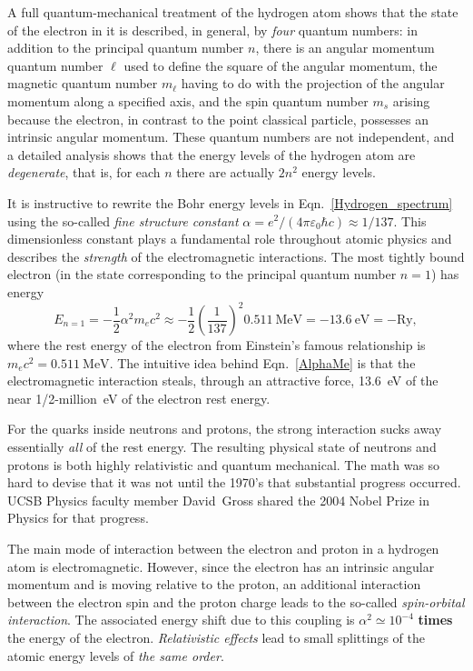 \documentclass[12pt]{article}
\begin{document}
A full quantum-mechanical treatment of the hydrogen atom shows that the state of the electron in it is described, in general, by \textit{four} quantum numbers: in addition to the principal quantum number $n$, there is an angular momentum quantum number $\ell$ used to define the square of the angular momentum, the magnetic quantum number $m_{\ell}$ having to do with the projection of the angular momentum along a specified axis, and the spin quantum number $m_s$ arising because the electron, in contrast to the point classical particle, possesses an intrinsic angular momentum. These quantum numbers are not independent, and a detailed analysis shows that the energy levels of the hydrogen atom are \textit{degenerate}, that is, for each $n$ there are actually $2n^2$ energy levels. 

It is instructive to rewrite the Bohr energy levels in Eqn.~\ref{Hydrogen_spectrum} using the so-called \textit{fine structure constant} $\alpha = e^2/(4\pi \varepsilon_0 \hbar c) \approx 1/137$. This dimensionless constant plays a fundamental role throughout atomic physics and describes the \textit{strength} of the electromagnetic interactions. The most tightly bound electron (in the state corresponding to the principal quantum number $n = 1$) has energy
\begin{equation}
    E_{n=1} = -\frac{1}{2}\alpha^2 m_e c^2 \approx -\frac{1}{2} \left(\frac{1}{137}\right)^2 0.511~\text{MeV} = -13.6~\text{eV} = -\text{Ry},
    \label{AlphaMe}
\end{equation}
where the rest energy of the electron from Einstein’s famous relationship is $m_e c^2 = 0.511~\text{MeV}$.  The intuitive idea behind Eqn.~\ref{AlphaMe} is that the electromagnetic interaction steals, through an attractive force,  13.6~eV of the near 1/2-million~eV of the electron rest energy.

For the quarks inside neutrons and protons, the strong interaction sucks away essentially \emph{all} of the rest energy.  The resulting physical state of neutrons and protons is both highly relativistic and quantum mechanical.  The math was so hard to devise that it was not until the 1970's that substantial progress occurred.  UCSB Physics faculty member David~Gross shared the 2004 Nobel Prize in Physics for that progress.

The main mode of interaction between the electron and proton in a hydrogen atom is electromagnetic. However, since the electron has an intrinsic angular momentum and is moving relative to the proton, an additional interaction between the electron spin and the proton charge leads to the so-called \textit{spin-orbital interaction}. The associated energy shift due to this coupling is $\alpha^2 \simeq 10^{-4}$ \textbf{times} the energy of the electron. \textit{Relativistic effects} lead to small splittings of the atomic energy levels of \textit{the same order}.
\end{document}
